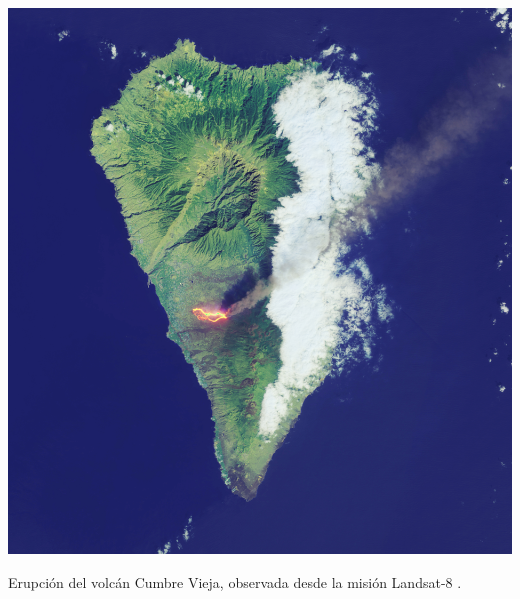 \begin{marginfigure}[3.0cm]
	\includegraphics{figs/introduction/landsat8_lapalma.jpg}
	\caption{Erupción del volcán Cumbre Vieja, observada desde la misión Landsat-8 \cite{nasa_earth_observatory_lava_2021}.}
	\label{fig:la_palma_landsat8_spanish}
\end{marginfigure}
